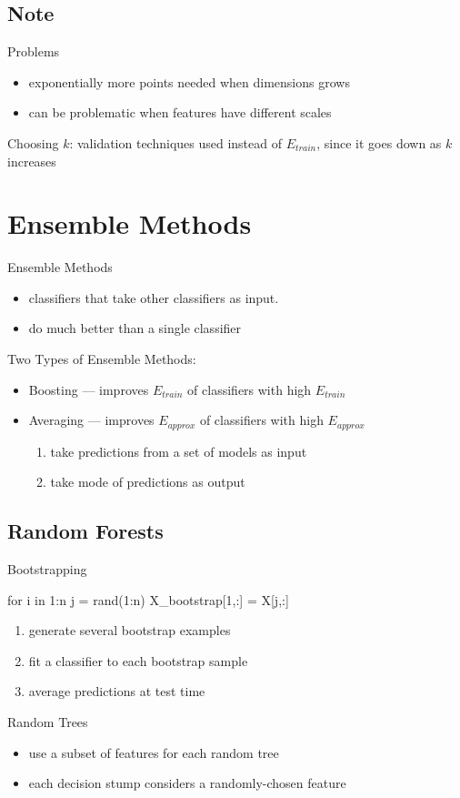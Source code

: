 \documentclass[10pt,landscape,a4paper]{article}
\begin{document}
\begin{multicols*}{5}
\subsection{Note}
Problems
\begin{itemize}
    \item exponentially more points needed when dimensions grows
    \item can be problematic when features have different scales
\end{itemize}
Choosing \(k\): validation techniques used instead of \(E_{train}\), since it goes down as \(k\) increases

\section{Ensemble Methods}
Ensemble Methods
\begin{itemize}
    \item classifiers that take other classifiers as input.
    \item do much better than a single classifier
\end{itemize}
Two Types of Ensemble Methods:
\begin{itemize}
    \item Boosting --- improves \(E_{train}\) of classifiers with high \(E_{train}\)
    \item Averaging --- improves \(E_{approx}\) of classifiers with high \(E_{approx}\)
    \begin{enumerate}
        \item take predictions from a set of models as input
        \item take mode of predictions as output
    \end{enumerate}
\end{itemize}

\subsection{Random Forests}
Bootstrapping
\begin{juliaText}{}
for i in 1:n
    j = rand(1:n)
    X_bootstrap[1,:] = X[j,:]
\end{juliaText}
\begin{enumerate}
    \item generate several bootstrap examples
    \item fit a classifier to each bootstrap sample
    \item average predictions at test time
\end{enumerate}
Random Trees
\begin{itemize}
    \item use a subset of features for each random tree
    \item each decision stump considers a randomly-chosen feature
\end{itemize}


\end{multicols*}
\end{document}
